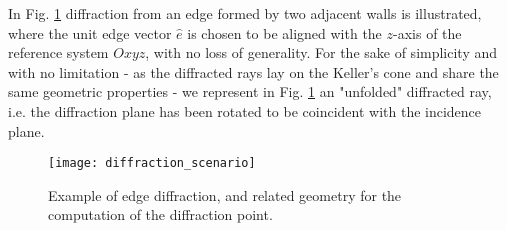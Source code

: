 In Fig. \ref{diffraction} diffraction from an edge formed by two adjacent walls is illustrated, where the unit edge vector $\hat{e}$ is chosen to be aligned with the $z$-axis of the reference system $Oxyz$, with no loss of generality. For the sake of simplicity and with no limitation - as the diffracted rays lay on the Keller's cone and share the same geometric properties \cite{Keller} - we represent in Fig. \ref{diffraction} an "unfolded" diffracted ray, i.e. the diffraction plane has been rotated to be coincident with the incidence plane. 

\begin{figure}[!ht]
	\centering
	\texttt{[image: diffraction\_scenario]}
	\caption{Example of edge diffraction, and related geometry for the computation of the diffraction point.}
	\label{diffraction}
\end{figure}

